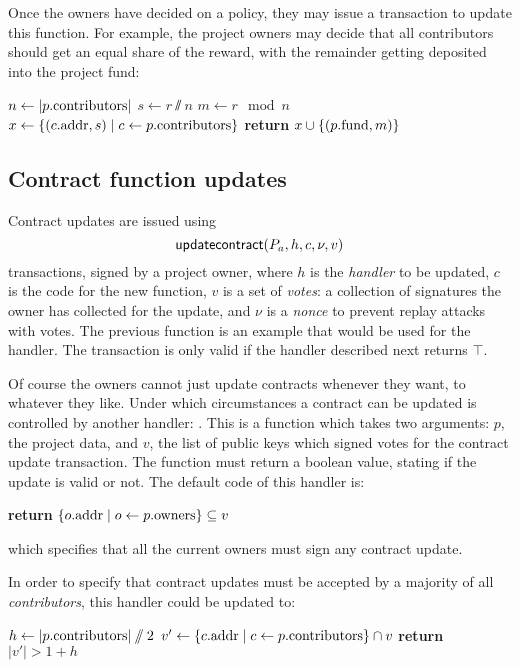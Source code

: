Once the owners have decided on a policy, they may issue a transaction to update
this function. For example, the project owners may decide that all contributors
should get an equal share of the reward, with the remainder getting deposited
into the project fund:
\medskip
\begin{algorithmic}[0]
        \State $n \gets |p.{\mathrm{contributors}}|$
        \State $s \gets r \sslash n$
        \State $m \gets r \mod n$
        \State $x \gets \{ (c.{\mathrm{addr}}, s) \mid c \gets p.{\mathrm{contributors}} \}$
        \State \textbf{return} $x \cup \{ (p.{\mathrm{fund}}, m) \}$
    \EndProcedure
\end{algorithmic}

\subsection{Contract function updates}

Contract updates are issued using
\[
    \mathsf{updatecontract}\lparen P_a, h, c, \nu, v\rparen
\]
transactions, signed by a project owner, where $h$ is the \emph{handler} to be
updated, $c$ is the code for the new function, $v$ is a set of \emph{votes}: a
collection of signatures the owner has collected for the update, and $\nu$ is a
\emph{nonce} to prevent replay attacks with votes. The previous function is an
example that would be used for the  handler. The
transaction is only valid if the  handler
described next returns $\top$.

Of course the owners cannot just update contracts whenever they want, to
whatever they like. Under which circumstances a contract can be updated is
controlled by another handler: . This is a
function which takes two arguments: $p$, the project data, and $v$, the list of
public keys which signed votes for the contract update transaction. The
function must return a boolean value, stating if the update is valid or not.
The default code of this handler is:
\begin{algorithmic}[0]
        \State \textbf{return} $\{ o.{\mathrm{addr}} \mid o \gets p.{\mathrm{owners}} \} \subseteq v$
    \EndProcedure
\end{algorithmic}
which specifies that all the current owners must sign any contract update.

In order to specify that contract updates must be accepted by a majority of all
\emph{contributors}, this handler could be updated to:
\medskip
\begin{algorithmic}[0]
        \State $h \gets |p.{\mathrm{contributors}}| \sslash 2$
        \State $v' \gets \{ c.{\mathrm{addr}} \mid c \gets p.{\mathrm{contributors}} \} \cap v$
        \State \textbf{return} $|v'| > 1 + h$
    \EndProcedure
\end{algorithmic}

